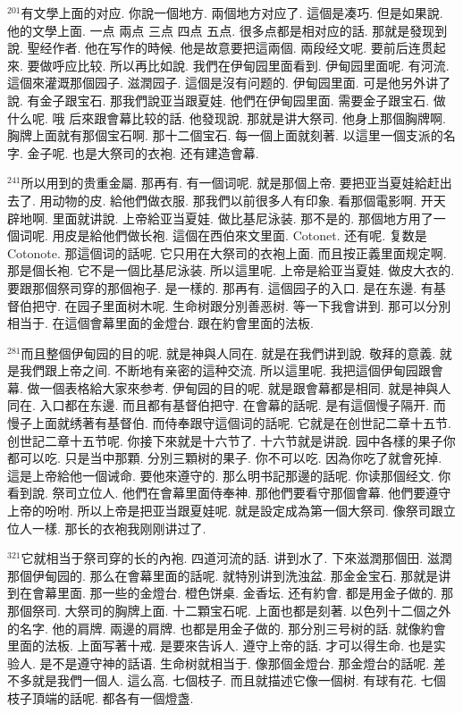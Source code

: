 \documentclass{book}
\begin{document}
$^{201}$有文學上面的对应.
你說一個地方.
兩個地方对应了.
這個是凑巧.
但是如果說.
他的文學上面.
一点 兩点 三点 四点 五点.
很多点都是相对应的話.
那就是發现到說.
聖经作者.
他在写作的時候.
他是故意要把這兩個.
兩段经文呢.
要前后连贯起來.
要做呼应比较.
所以再比如說.
我們在伊甸园里面看到.
伊甸园里面呢.
有河流.
這個來灌溉那個园子.
滋潤园子.
這個是沒有问题的.
伊甸园里面.
可是他另外讲了說.
有金子跟宝石.
那我們說亚当跟夏娃.
他們在伊甸园里面.
需要金子跟宝石.
做什么呢.
哦 后來跟會幕比较的話.
他發现說.
那就是讲大祭司.
他身上那個胸牌啊.
胸牌上面就有那個宝石啊.
那十二個宝石.
每一個上面就刻著.
以這里一個支派的名字.
金子呢.
也是大祭司的衣袍.
还有建造會幕.

$^{241}$所以用到的贵重金屬.
那再有.
有一個词呢.
就是那個上帝.
要把亚当夏娃給赶出去了.
用动物的皮.
給他們做衣服.
那我們以前很多人有印象.
看那個電影啊.
开天辟地啊.
里面就讲說.
上帝給亚当夏娃.
做比基尼泳装.
那不是的.
那個地方用了一個词呢.
用皮是給他們做长袍.
這個在西伯來文里面.
Cotonet.
还有呢.
复数是Cotonote.
那這個词的話呢.
它只用在大祭司的衣袍上面.
而且按正義里面规定啊.
那是個长袍.
它不是一個比基尼泳装.
所以這里呢.
上帝是給亚当夏娃.
做皮大衣的.
要跟那個祭司穿的那個袍子.
是一樣的.
那再有.
這個园子的入口.
是在东邊.
有基督伯把守.
在园子里面树木呢.
生命树跟分別善恶树.
等一下我會讲到.
那可以分別相当于.
在這個會幕里面的金燈台.
跟在約會里面的法板.

$^{281}$而且整個伊甸园的目的呢.
就是神與人同在.
就是在我們讲到說.
敬拜的意義.
就是我們跟上帝之间.
不断地有亲密的這种交流.
所以這里呢.
我把這個伊甸园跟會幕.
做一個表格給大家來参考.
伊甸园的目的呢.
就是跟會幕都是相同.
就是神與人同在.
入口都在东邊.
而且都有基督伯把守.
在會幕的話呢.
是有這個慢子隔开.
而慢子上面就绣著有基督伯.
而侍奉跟守這個词的話呢.
它就是在创世記二章十五节.
创世記二章十五节呢.
你接下來就是十六节了.
十六节就是讲說.
园中各樣的果子你都可以吃.
只是当中那顆.
分別三顆树的果子.
你不可以吃.
因為你吃了就會死掉.
這是上帝給他一個诫命.
要他來遵守的.
那么明书記那邊的話呢.
你读那個经文.
你看到說.
祭司立位人.
他們在會幕里面侍奉神.
那他們要看守那個會幕.
他們要遵守上帝的吩咐.
所以上帝是把亚当跟夏娃呢.
就是設定成為第一個大祭司.
像祭司跟立位人一樣.
那长的衣袍我刚刚讲过了.

$^{321}$它就相当于祭司穿的长的內袍.
四道河流的話.
讲到水了.
下來滋潤那個田.
滋潤那個伊甸园的.
那么在會幕里面的話呢.
就特別讲到洗浊盆.
那金金宝石.
那就是讲到在會幕里面.
那一些的金燈台.
橙色饼桌.
金香坛.
还有約會.
都是用金子做的.
那那個祭司.
大祭司的胸牌上面.
十二顆宝石呢.
上面也都是刻著.
以色列十二個之外的名字.
他的肩牌.
兩邊的肩牌.
也都是用金子做的.
那分別三号树的話.
就像約會里面的法板.
上面写著十戒.
是要來告诉人.
遵守上帝的話.
才可以得生命.
也是实验人.
是不是遵守神的話语.
生命树就相当于.
像那個金燈台.
那金燈台的話呢.
差不多就是我們一個人.
這么高.
七個枝子.
而且就描述它像一個树.
有球有花.
七個枝子頂端的話呢.
都各有一個燈盏.
\end{document}
